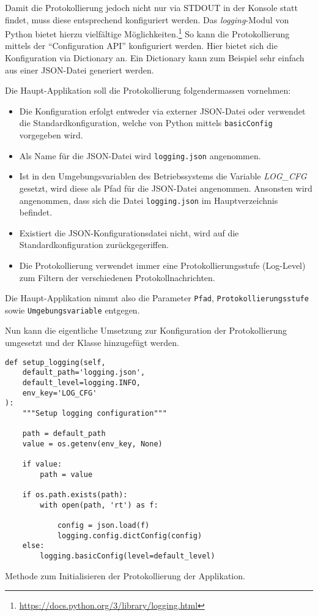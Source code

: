 \documentclass[10pt, openright, notitlepage]{scrreprt}
\begin{document}
Damit die Protokollierung jedoch nicht nur via STDOUT in der Konsole statt
findet, muss diese entsprechend konfiguriert werden. Das \emph{logging}-Modul von
Python bietet hierzu vielfältige
Möglichkeiten.\footnote{\url{https://docs.python.org/3/library/logging.html}} So kann die
Protokollierung mittels der ``Configuration API'' konfiguriert werden. Hier
bietet sich die Konfiguration via Dictionary an. Ein Dictionary kann zum
Beispiel sehr einfach aus einer JSON-Datei generiert werden.

Die Haupt-Applikation soll die Protokollierung folgendermassen vornehmen:
\begin{itemize}
\item Die Konfiguration erfolgt entweder via externer JSON-Datei oder verwendet die
Standardkonfiguration, welche von Python mittels \texttt{basicConfig} vorgegeben
wird.
\item Als Name für die JSON-Datei wird \texttt{logging.json} angenommen.
\item Ist in den Umgebungsvariablen des Betriebssystems die Variable \emph{LOG\_CFG}
gesetzt, wird diese als Pfad für die JSON-Datei angenommen. Ansonsten wird
angenommen, dass sich die Datei \texttt{logging.json} im Hauptverzeichnis befindet.
\item Existiert die JSON-Konfigurationsdatei nicht, wird auf die
Standardkonfiguration zurückgegeriffen.
\item Die Protokollierung verwendet immer eine Protokollierungsstufe (Log-Level)
zum Filtern der verschiedenen Protokollnachrichten.
\end{itemize}

Die Haupt-Applikation nimmt also die Parameter \texttt{Pfad}, \texttt{Protokollierungsstufe}
sowie \texttt{Umgebungsvariable} entgegen.

Nun kann die eigentliche Umsetzung zur Konfiguration der Protokollierung
umgesetzt und der Klasse hinzugefügt werden.

\begin{listing}[H]
\begin{verbatim}
def setup_logging(self,
    default_path='logging.json',
    default_level=logging.INFO,
    env_key='LOG_CFG'
):
    """Setup logging configuration"""

    path = default_path
    value = os.getenv(env_key, None)

    if value:
        path = value

    if os.path.exists(path):
        with open(path, 'rt') as f:

            config = json.load(f)
            logging.config.dictConfig(config)
    else:
        logging.basicConfig(level=default_level)
\end{verbatim}
\caption{\label{org294a9b8}
Methode zum Initialisieren der Protokollierung der Applikation.}
\end{listing}
\end{document}
